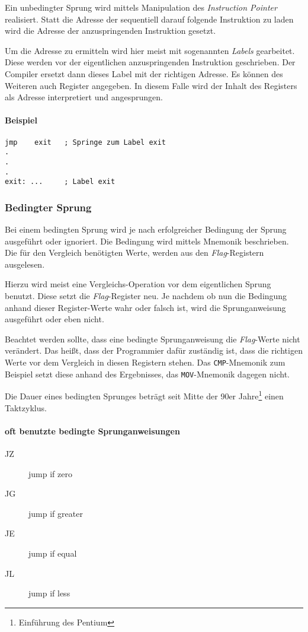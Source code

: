 Ein unbedingter Sprung wird mittels Manipulation des \textit{Instruction Pointer} realisiert.
Statt die Adresse der sequentiell darauf folgende Instruktion zu laden wird die Adresse der anzuspringenden Instruktion gesetzt.

Um die Adresse zu ermitteln wird hier meist mit sogenannten \textit{Labels} gearbeitet. Diese werden vor der eigentlichen anzuspringenden Instruktion geschrieben. Der Compiler ersetzt dann dieses Label mit der richtigen Adresse. Es können des Weiteren auch Register angegeben. In diesem Falle wird der Inhalt des Registers als Adresse interpretiert und angesprungen.

\paragraph{Beispiel\newline}\makebox{}
\begin{lstlisting}
jmp    exit   ; Springe zum Label exit
.
.
.
exit: ...     ; Label exit
\end{lstlisting}

\subsubsection{Bedingter Sprung}
Bei einem bedingten Sprung wird je nach erfolgreicher Bedingung der Sprung ausgeführt oder ignoriert. Die Bedingung wird mittels Mnemonik beschrieben. Die für den Vergleich benötigten Werte, werden aus den \textit{Flag}-Registern ausgelesen.

Hierzu wird meist eine Vergleichs-Operation vor dem eigentlichen Sprung benutzt. Diese setzt die \textit{Flag}-Register neu. Je nachdem ob nun die Bedingung anhand dieser Register-Werte wahr oder falsch ist, wird die Sprunganweisung ausgeführt oder eben nicht.

Beachtet werden sollte, dass eine bedingte Sprunganweisung die \textit{Flag}-Werte nicht verändert. Das heißt, dass der Programmier dafür zuständig ist, dass die richtigen Werte vor dem Vergleich in diesen Registern stehen. Das \texttt{CMP}-Mnemonik zum Beispiel setzt diese anhand des Ergebnisses, das \texttt{MOV}-Mnemonik dagegen nicht.

Die Dauer eines bedingten Sprunges beträgt seit Mitte der 90er Jahre\footnote{Einführung des Pentium} einen Taktzyklus.

\paragraph{oft benutzte bedingte Sprunganweisungen}
\begin{description}
    \item [JZ] jump if zero
    \item [JG] jump if greater
    \item [JE] jump if equal
    \item [JL] jump if less
\end{description}

